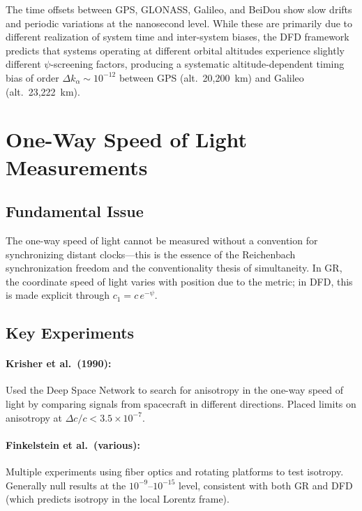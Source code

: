 \documentclass[12pt,letterpaper]{article}
\begin{document}
The time offsets between GPS, GLONASS, Galileo, and BeiDou show
slow drifts and periodic variations at the nanosecond level. While these
are primarily due to different realization of system time and inter-system
biases, the DFD framework predicts that systems operating at different
orbital altitudes experience slightly different $\psi$-screening factors,
producing a systematic altitude-dependent timing bias of order
$\Delta k_\alpha \sim 10^{-12}$ between GPS (alt.~20,200~km) and Galileo
(alt.~23,222~km).

\section{One-Way Speed of Light Measurements}

\subsection{Fundamental Issue}

The one-way speed of light cannot be measured without a convention for
synchronizing distant clocks---this is the essence of the Reichenbach
synchronization freedom and the conventionality thesis of simultaneity.
In GR, the coordinate speed of light varies with position due to the
metric; in DFD, this is made explicit through $c_1 = c\,e^{-\psi}$.

\subsection{Key Experiments}

\paragraph{Krisher et al.\ (1990):}
Used the Deep Space Network to search for anisotropy in the one-way
speed of light by comparing signals from spacecraft in different
directions. Placed limits on anisotropy at $\Delta c/c < 3.5\times10^{-7}$.

\paragraph{Finkelstein et al.\ (various):}
Multiple experiments using fiber optics and rotating platforms to test
isotropy. Generally null results at the $10^{-9}$--$10^{-15}$ level,
consistent with both GR and DFD (which predicts isotropy in the local
Lorentz frame).
\end{document}
